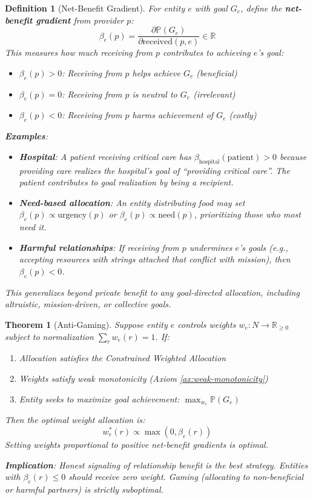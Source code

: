 \documentclass[11pt]{article}
\newtheorem{definition}{Definition}
\newtheorem{theorem}{Theorem}
\begin{document}
\begin{definition}[Net-Benefit Gradient]
For entity $e$ with goal $G_e$, define the \textbf{net-benefit gradient} from provider $p$:
\[
\beta_e(p) = \frac{\partial \mathbb{P}(G_e)}{\partial \text{received}(p, e)} \in \mathbb{R}
\]
This measures how much receiving from $p$ contributes to achieving $e$'s goal:
\begin{itemize}
\item $\beta_e(p) > 0$: Receiving from $p$ helps achieve $G_e$ (beneficial)
\item $\beta_e(p) = 0$: Receiving from $p$ is neutral to $G_e$ (irrelevant)
\item $\beta_e(p) < 0$: Receiving from $p$ harms achievement of $G_e$ (costly)
\end{itemize}

\textbf{Examples}:
\begin{itemize}
\item \textbf{Hospital}: A patient receiving critical care has $\beta_{\text{hospital}}(\text{patient}) > 0$ because providing care realizes the hospital's goal of ``providing critical care''. The patient contributes to goal realization by being a recipient.
\item \textbf{Need-based allocation}: An entity distributing food may set $\beta_e(p) \propto \text{urgency}(p)$ or $\beta_e(p) \propto \text{need}(p)$, prioritizing those who most need it.
\item \textbf{Harmful relationships}: If receiving from $p$ undermines $e$'s goals (e.g., accepting resources with strings attached that conflict with mission), then $\beta_e(p) < 0$.
\end{itemize}

This generalizes beyond private benefit to \emph{any} goal-directed allocation, including altruistic, mission-driven, or collective goals.
\end{definition}

\begin{theorem}[Anti-Gaming]
\label{thm:anti-gaming-commons}
Suppose entity $e$ controls weights $w_e: N \to \mathbb{R}_{\geq 0}$ subject to normalization $\sum_r w_e(r) = 1$. If:
\begin{enumerate}
\item Allocation satisfies the Constrained Weighted Allocation
\item Weights satisfy weak monotonicity (Axiom \ref{ax:weak-monotonicity})
\item Entity seeks to maximize goal achievement: $\max_{w_e} \mathbb{P}(G_e)$
\end{enumerate}

Then the optimal weight allocation is:
\[
w_e^*(r) \propto \max(0, \beta_e(r))
\]
Setting weights proportional to \emph{positive} net-benefit gradients is optimal.

\textbf{Implication}: Honest signaling of relationship benefit is the best strategy. Entities with $\beta_e(r) \leq 0$ should receive zero weight. Gaming (allocating to non-beneficial or harmful partners) is strictly suboptimal.
\end{theorem}
\end{document}
